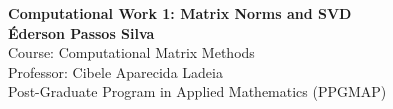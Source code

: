 \documentclass[12pt, a4paper]{article}
\begin{document}
\begin{center}
    {\Large \textbf{Computational Work 1: Matrix Norms and SVD}}\\
    \vspace{0.5cm}
    {\large \textbf{Éderson Passos Silva}}\\ %
    \vspace{0.3cm}
    {\small Course: Computational Matrix Methods}\\
    {\small Professor: Cibele Aparecida Ladeia}\\
    {\small Post-Graduate Program in Applied Mathematics (PPGMAP)}\\
    \vspace{0.8cm}
\end{center}









\clearpage
\appendix

\end{document}
